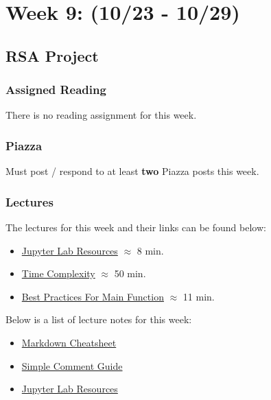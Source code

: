 \clearpage
\chapter{Week 9: (10/23 - 10/29)}

\section{RSA Project}

\subsection{Assigned Reading}

There is no reading assignment for this week.

\subsection{Piazza}

Must post / respond to at least \textbf{two} Piazza posts this week.  

\subsection{Lectures}

The lectures for this week and their links can be found below:

\begin{itemize}
    \item \href{https://applied.cs.colorado.edu/mod/hvp/view.php?id=51743}{Jupyter Lab Resources} $\approx$ 8 min.
    \item \href{https://applied.cs.colorado.edu/mod/hvp/view.php?id=51746}{Time Complexity} $\approx$ 50 min.
    \item \href{https://www.youtube.com/watch?v=lOeIDvyRUQs}{Best Practices For Main Function} $\approx$ 11 min.
\end{itemize}

\noindent Below is a list of lecture notes for this week:

\begin{itemize}
    \item \href{https://github.com/adam-p/markdown-here/wiki/Markdown-Cheatsheet}{Markdown Cheatsheet}
    \item \href{https://realpython.com/python-comments-guide/}{Simple Comment Guide}
    \item \href{https://www.colorado.edu/cs/students/computing-resources-students}{Jupyter Lab Resources}
\end{itemize}

